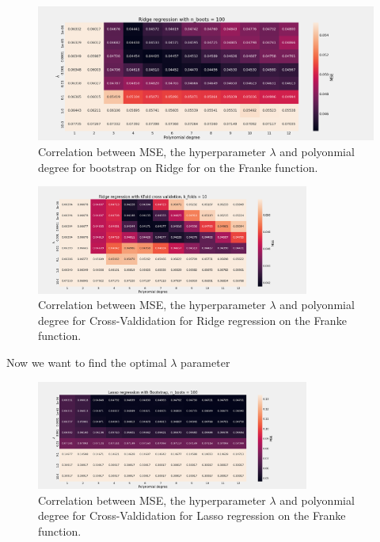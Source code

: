 \begin{figure}[H]
    \centering
    \caption{Correlation between MSE, the hyperparameter $\lambda$ and polyonmial degree for bootstrap on Ridge for on the Franke function.}  
    \label{fig:e_ridge} 
    \includegraphics[width=1\textwidth]{Figures/e_ridge_n_boots_100.png}
\end{figure}

\begin{figure}[H]
    \centering
    \caption{Correlation between MSE, the hyperparameter $\lambda$ and polyonmial degree for Cross-Valdidation for Ridge regression on the Franke function.}
    \label{fig:e_ridge_kfold}
    \includegraphics[width=0.8\textwidth]{Figures/e_ridge_kfold_n_10.png}
\end{figure}

Now we want to find the optimal $\lambda$ parameter 




\begin{figure}[H]
    \centering
	\caption{Correlation between MSE, the hyperparameter $\lambda$ and polyonmial degree for Cross-Valdidation for Lasso regression on the Franke function.}
	\label{fig:f_lasso_bootstrap}
    \includegraphics[width=0.8\textwidth]{Figures/f_lasso_bootstrap_n_100.png}
\end{figure}

